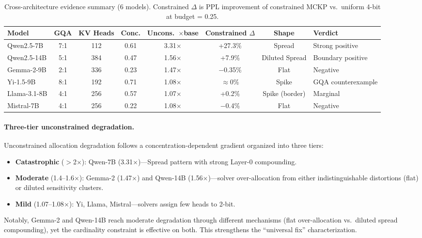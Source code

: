 \documentclass[11pt,a4paper]{article}
\begin{document}
\begin{table}[t]
\centering
\caption{Cross-architecture evidence summary (6 models). Constrained $\Delta$ is PPL improvement of constrained MCKP vs.\ uniform 4-bit at budget = 0.25.}
\label{tab:cross_arch}
\small
\begin{tabular}{lccccccl}
\toprule
Model & GQA & KV Heads & Conc. & Uncons.\ $\times$base & Constrained $\Delta$ & Shape & Verdict \\
\midrule
Qwen2.5-7B   & 7:1 & 112 & 0.61 & 3.31$\times$ & +27.3\% & Spread         & Strong positive \\
Qwen2.5-14B  & 5:1 & 384 & 0.47 & 1.56$\times$ & +7.9\%  & Diluted Spread & Boundary positive \\
Gemma-2-9B   & 2:1 & 336 & 0.23 & 1.47$\times$ & $-$0.35\% & Flat         & Negative \\
Yi-1.5-9B    & 8:1 & 192 & 0.71 & 1.08$\times$ & $\approx$0\% & Spike     & GQA counterexample \\
Llama-3.1-8B & 4:1 & 256 & 0.57 & 1.07$\times$ & +0.2\%  & Spike (border) & Marginal \\
Mistral-7B   & 4:1 & 256 & 0.22 & 1.08$\times$ & $-$0.4\% & Flat          & Negative \\
\bottomrule
\end{tabular}
\end{table}

\paragraph{Three-tier unconstrained degradation.}
Unconstrained allocation degradation follows a concentration-dependent gradient organized into three tiers:
\begin{itemize}
    \item \textbf{Catastrophic} ($>$2$\times$): Qwen-7B (3.31$\times$)---Spread pattern with strong Layer-0 compounding.
    \item \textbf{Moderate} (1.4--1.6$\times$): Gemma-2 (1.47$\times$) and Qwen-14B (1.56$\times$)---solver over-allocation from either indistinguishable distortions (flat) or diluted sensitivity clusters.
    \item \textbf{Mild} (1.07--1.08$\times$): Yi, Llama, Mistral---solvers assign few heads to 2-bit.
\end{itemize}
Notably, Gemma-2 and Qwen-14B reach moderate degradation through different mechanisms (flat over-allocation vs.\ diluted spread compounding), yet the cardinality constraint is effective on both.
This strengthens the ``universal fix'' characterization.
\end{document}
